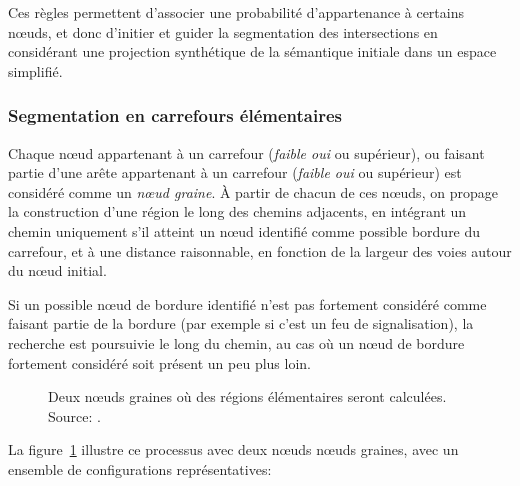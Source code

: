 \newpar{}

Ces règles permettent d'associer une probabilité d'appartenance à certains nœuds, et donc d'initier et guider la segmentation des intersections en considérant une projection synthétique de la sémantique initiale dans un espace simplifié.

\subsubsection{Segmentation en carrefours élémentaires}

Chaque nœud appartenant à un carrefour (\textit{faible oui} ou supérieur), ou faisant partie d'une arête appartenant à un carrefour (\textit{faible oui} ou supérieur) est considéré comme un \emph{nœud graine}. À partir de chacun de ces nœuds, on propage la construction d'une région le long des chemins adjacents, en intégrant un chemin uniquement s'il atteint un nœud identifié comme possible bordure du carrefour, et à une distance raisonnable, en fonction de la largeur des voies autour du nœud initial.

\newpar{}

Si un possible nœud de bordure identifié n'est pas fortement considéré comme faisant partie de la bordure (par exemple si c'est un feu de signalisation), la recherche est poursuivie le long du chemin, au cas où un nœud de bordure fortement considéré soit présent un peu plus loin.

\begin{figure}
    \centering
    \caption{Deux nœuds graines où des régions élémentaires seront calculées. Source: \cite{Favreau2022}.}
    \label{fig:modelisation_boundarySelection}
\end{figure}

\newpar{}

La figure~\ref{fig:modelisation_boundarySelection} illustre ce processus avec deux nœuds nœuds graines, avec un ensemble de configurations représentatives: 

